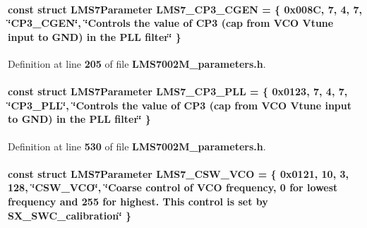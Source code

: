 \paragraph[{L\+M\+S7\+\_\+\+C\+P3\+\_\+\+C\+G\+EN}]{\setlength{\rightskip}{0pt plus 5cm}const struct {\bf L\+M\+S7\+Parameter} L\+M\+S7\+\_\+\+C\+P3\+\_\+\+C\+G\+EN = \{ 0x008\+C, 7, 4, 7, \char`\"{}\+C\+P3\+\_\+\+C\+G\+E\+N\char`\"{}, \char`\"{}\+Controls the value of C\+P3 (cap from V\+C\+O Vtune input to G\+N\+D) in the P\+L\+L filter\char`\"{} \}\hspace{0.3cm}{\ttfamily [static]}}\label{LMS7002M__parameters_8h_a9c4a2389c8ab64ec2778d3c3e500999c}


Definition at line {\bf 205} of file {\bf L\+M\+S7002\+M\+\_\+parameters.\+h}.

\paragraph[{L\+M\+S7\+\_\+\+C\+P3\+\_\+\+P\+LL}]{\setlength{\rightskip}{0pt plus 5cm}const struct {\bf L\+M\+S7\+Parameter} L\+M\+S7\+\_\+\+C\+P3\+\_\+\+P\+LL = \{ 0x0123, 7, 4, 7, \char`\"{}\+C\+P3\+\_\+\+P\+L\+L\char`\"{}, \char`\"{}\+Controls the value of C\+P3 (cap from V\+C\+O Vtune input to G\+N\+D) in the P\+L\+L filter\char`\"{} \}\hspace{0.3cm}{\ttfamily [static]}}\label{LMS7002M__parameters_8h_add268bff0bc95cac2503b6fca23360ba}


Definition at line {\bf 530} of file {\bf L\+M\+S7002\+M\+\_\+parameters.\+h}.

\paragraph[{L\+M\+S7\+\_\+\+C\+S\+W\+\_\+\+V\+CO}]{\setlength{\rightskip}{0pt plus 5cm}const struct {\bf L\+M\+S7\+Parameter} L\+M\+S7\+\_\+\+C\+S\+W\+\_\+\+V\+CO = \{ 0x0121, 10, 3, 128, \char`\"{}\+C\+S\+W\+\_\+\+V\+C\+O\char`\"{}, \char`\"{}\+Coarse control of V\+C\+O frequency, 0 for lowest frequency and 255 for highest. This control is set by S\+X\+\_\+\+S\+W\+C\+\_\+calibration\char`\"{} \}\hspace{0.3cm}{\ttfamily [static]}}\label{LMS7002M__parameters_8h_a6f329f1443a25cfacedbbe2180b3a025}


